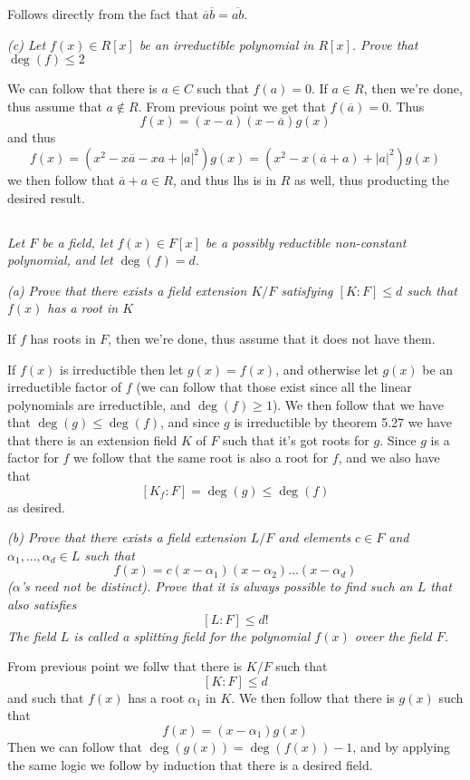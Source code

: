 \documentclass[11pt,oneside,titlepage]{book}
\begin{document}
Follows directly from the fact that $\overline{a}\overline{b} = \overline{ab}$.

\textit{(c) Let $f(x) \in R[x]$ be an irreductible polynomial in
  $R[x]$. Prove that $\deg(f) \leq 2$}

We can follow that there is $a \in C$ such that $f(a) = 0$. If $a \in
R$, then we're done, thus assume that $a \notin R$. From previous
point we get that $f(\overline{a}) = 0$. Thus
$$f(x) = (x - a)(x - \overline{a})g(x)$$
and thus
$$f(x) = (x^2 - x\overline{a} - xa + |a|^2)g(x) = (x^2 - x(\overline{a} + a) + |a|^2)g(x)$$
we then follow that $\overline{a} + a \in R$, and thus lhs is in $R$
as well, thus producting the desired result.

\subsection{}

\textit{Let $F$ be a field, let $f(x) \in F[x]$ be a possibly reductible non-constant
  polynomial, and let $\deg(f) = d$. }

\textit{(a) Prove that there exists a field extension $K/F$ satisfying $[K:F] \leq d$
  such that $f(x)$ has a root in $K$}

If $f$ has roots in $F$, then we're done, thus assume that it does not
have them.

If $f(x)$ is irreductible then let $g(x) = f(x)$, and otherwise let $g(x)$ be
an irreductible factor of $f$ (we can follow that those exist since all
the linear polynomials are irreductible, and $\deg(f) \geq 1$). We then follow
that we have that $\deg(g) \leq \deg(f)$, and since $g$ is irreductible by theorem
5.27 we have that there is an extension field $K$ of $F$ such that it's got
roots for $g$. Since $g$ is a factor for $f$ we follow that the same
root is also a root for $f$, and we also have that
$$[K_f:F] = \deg(g) \leq \deg(f)$$
as desired.

\textit{(b) Prove that there exists a field extension $L/F$ and elements $c \in F$
  and $\alpha_1, ..., \alpha_d \in L$ such that
  $$f(x) = c(x - \alpha_1)(x - \alpha_2)...(x - \alpha_d)$$
  ($\alpha$'s need not be distinct). Prove that it is always possible
  to find such an $L$ that also satisfies
  $$[L:F] \leq d!$$
  The field $L$ is called a splitting field for the polynomial $f(x)$
  oveer the field $F$.
}

From previous point we follw that there is $K/F$ such that
$$[K:F] \leq d$$
and such that $f(x)$ has a root $\alpha_1$ in $K$. We then follow that
there is $g(x)$ such that
$$f(x) = (x - \alpha_1)g(x)$$
Then we can follow that $\deg(g(x)) = \deg(f(x)) - 1$, and by applying
the same logic we follow by induction that there is a desired field.
\end{document}
